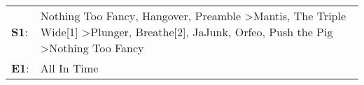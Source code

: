 \begin{supertabular}{p{0.03\textwidth}p{0.92\textwidth}}
 \textbf{S1}:  &  Nothing Too Fancy\textsuperscript{}, \enspace Hangover\textsuperscript{}, \enspace Preamble\textsuperscript{} \textgreater \enspace Mantis\textsuperscript{}, \enspace The Triple Wide[1]\textsuperscript{} \textgreater \enspace Plunger\textsuperscript{}, \enspace Breathe[2]\textsuperscript{}, \enspace JaJunk\textsuperscript{}, \enspace Orfeo\textsuperscript{}, \enspace Push the Pig\textsuperscript{} \textgreater \enspace Nothing Too Fancy\textsuperscript{}  \enspace  \\
 \textbf{E1}:  &                                                                                                                                                                                                                                                                                                                                                                                                                                               All In Time\textsuperscript{}  \enspace  \\
\end{supertabular}
